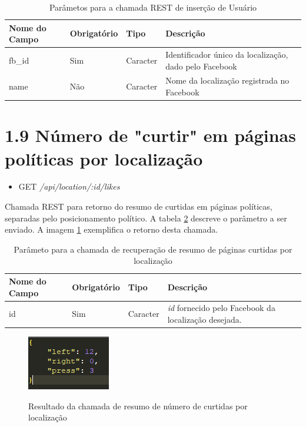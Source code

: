 \documentclass[
	12pt,				%
	oneside,			%
	a4paper,			%
	english,			%
	brazil				%
	]{abntex2ppgsi}
\begin{document}
\begin{apendicesenv}
 \begin{table}[htbp]
	\centering
	\caption{Parâmetos para a chamada REST de inserção de Usuário}
	\begin{tabular}{p{1.5in} p{1in} p{1in} p{1.5in}  } \hline
		Nome do Campo 		& 		Obrigatório 		& 		Tipo 		&		 Descrição \\ \hline
		fb\_id				& 		Sim					&	Caracter		& Identificador único da localização, dado pelo Facebook \\
		name				& 		Não					& 	Caracter 		& Nome da localização registrada no Facebook \\
	\end{tabular}
	\label{tab:tabelaBodyLocation}
\end{table}

\section*{1.9 Número de "curtir" em páginas políticas por localização}

\begin{itemize}
	\item {GET} \textit{/api/location/:id/likes}
\end{itemize}

Chamada REST para retorno do resumo de curtidas em páginas políticas, separadas pelo posicionamento político. A tabela \ref{tab:tabelaLocationLikeSummary} descreve o parâmetro a ser enviado. A imagem \ref{fig:retornoLocationLikeSummary} exemplifica o retorno desta chamada.

 \begin{table}[htbp]
	\centering
	\caption{Parâmeto para a chamada de recuperação de resumo de páginas curtidas por localização}
	\begin{tabular}{p{1.5in} p{1in} p{1in} p{1.5in}  } \hline
		Nome do Campo 		& 		Obrigatório 		& 		Tipo 		&		 Descrição \\ \hline
		id				& 		Sim					& Caracter 		&
		\textit{id} fornecido pelo Facebook da localização desejada. 
	\end{tabular}
	\label{tab:tabelaLocationLikeSummary}
\end{table}

\begin{figure}[H]
	\centering
	\caption{Resultado da chamada de resumo de número de curtidas por localização}
	\includegraphics[scale=1]{resultadoLocationLikeSummary.png}
	\label{fig:retornoLocationLikeSummary}
\end{figure}


\end{apendicesenv}
\end{document}
